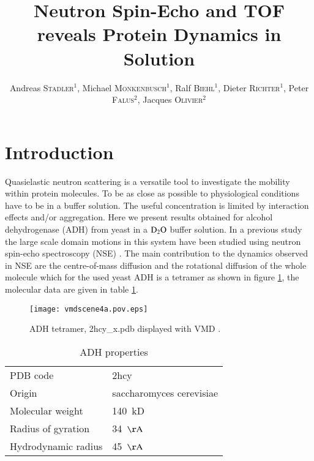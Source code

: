 \documentclass{jpsj-suppl}
\title{Neutron Spin-Echo and TOF reveals Protein Dynamics in Solution}
\author{Andreas \textsc{Stadler}$^{1}$, 
        Michael \textsc{Monkenbusch}$^{1}$, 
        Ralf \textsc{Biehl}$^{1}$, 
        Dieter \textsc{Richter}$^{1}$, 
        Peter \textsc{Falus}$^{2}$, 
        Jacques \textsc{Olivier}$^{2}$}
\begin{document}
\maketitle

\section{Introduction}
\label{sec:intro}
Quasielastic neutron scattering is a versatile tool to investigate the mobility within protein molecules.
To be as close as possible to physiological conditions have to be in a buffer solution. The useful concentration
is limited by interaction effects and/or aggregation.
Here we present results obtained for alcohol dehydrogenase (ADH) from yeast in a ${\rm D_2O}$ buffer solution.
In a previous study the large scale domain motions in this system have been studied using neutron 
spin-echo spectroscopy (NSE) \cite{biehl08rb}. The main contribution to the dynamics observed in NSE are the centre-of-mass
diffusion and the rotational diffusion of the whole molecule which for the used yeast ADH is a tetramer as shown in 
figure \ref{fig:1}, the molecular data are given in table \ref{tab:1}.
\begin{figure}[ht]
	\centering
  \texttt{[image: vmdscene4a.pov.eps]}
	\caption{ADH tetramer, 2hcy\_x.pdb displayed with VMD \cite{humphrey96biodyn}.}
	\label{fig:1}
\end{figure}


\begin{table}[tbh]
\caption{ADH properties}
\label{tab:1}
\begin{tabular}{ll}
\hline
PDB code            & 2hcy                         \\
Origin              & saccharomyces cerevisiae     \\
Molecular weight    & 140~kD                       \\
Radius of gyration  & 34~${\rm \AA}$               \\
Hydrodynamic radius & 45~${\rm \AA}$               \\
\hline
\end{tabular}
\end{table}
%
\end{document}
